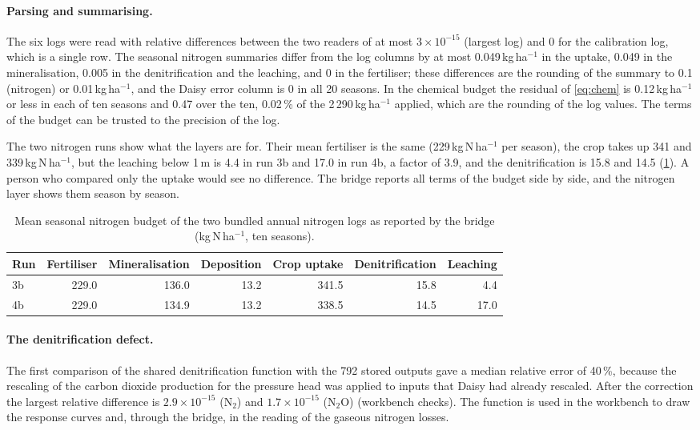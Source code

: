 \paragraph{Parsing and summarising.}
The six logs were read with relative differences between the two readers of at most $3\times10^{-15}$ (largest log) and 0 for the calibration log, which is a single row. The seasonal nitrogen summaries differ from the log columns by at most 0.049\,kg\,ha$^{-1}$ in the uptake, 0.049 in the mineralisation, 0.005 in the denitrification and the leaching, and 0 in the fertiliser; these differences are the rounding of the summary to 0.1 (nitrogen) or 0.01\,kg\,ha$^{-1}$, and the Daisy error column is 0 in all 20 seasons. In the chemical budget the residual of \cref{eq:chem} is 0.12\,kg\,ha$^{-1}$ or less in each of ten seasons and 0.47 over the ten, 0.02\,\% of the 2\,290\,kg\,ha$^{-1}$ applied, which are the rounding of the log values. The terms of the budget can be trusted to the precision of the log.

The two nitrogen runs show what the layers are for. Their mean fertiliser is the same (229\,kg\,N\,ha$^{-1}$ per season), the crop takes up 341 and 339\,kg\,N\,ha$^{-1}$, but the leaching below 1\,m is 4.4 in run 3b and 17.0 in run 4b, a factor of 3.9, and the denitrification is 15.8 and 14.5 (\cref{tab:nrun}). A person who compared only the uptake would see no difference. The bridge reports all terms of the budget side by side, and the nitrogen layer shows them season by season.

\begin{table}[H]\centering\small
\caption{Mean seasonal nitrogen budget of the two bundled annual nitrogen logs as reported by the bridge (kg\,N\,ha$^{-1}$, ten seasons).}\label{tab:nrun}
\begin{tabular}{lrrrrrr}\toprule
Run & Fertiliser & Mineralisation & Deposition & Crop uptake & Denitrification & Leaching\\\midrule
3b & 229.0 & 136.0 & 13.2 & 341.5 & 15.8 & 4.4\\
4b & 229.0 & 134.9 & 13.2 & 338.5 & 14.5 & 17.0\\\bottomrule
\end{tabular}
\end{table}

\paragraph{The denitrification defect.}
The first comparison of the shared denitrification function with the 792 stored outputs gave a median relative error of 40\,\%, because the rescaling of the carbon dioxide production for the pressure head was applied to inputs that Daisy had already rescaled. After the correction the largest relative difference is $2.9\times10^{-15}$ (N$_2$) and $1.7\times10^{-15}$ (N$_2$O) (workbench checks). The function is used in the workbench to draw the response curves and, through the bridge, in the reading of the gaseous nitrogen losses.

